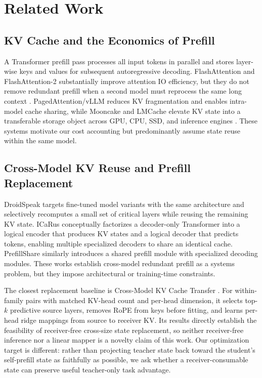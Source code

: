 \documentclass[10pt]{article}
\begin{document}
\section{Related Work}
\subsection{KV Cache and the Economics of Prefill}
A Transformer prefill pass processes all input tokens in parallel and stores layer-wise keys and
values for subsequent autoregressive decoding. FlashAttention and FlashAttention-2 substantially
improve attention IO efficiency, but they do not remove redundant prefill when a second model must
reprocess the same long context \cite{dao2022flashattention,dao2024flashattention2}.
PagedAttention/vLLM reduces KV fragmentation and enables intra-model cache sharing, while Mooncake
and LMCache elevate KV state into a transferable storage object across GPU, CPU, SSD, and
inference engines \cite{kwon2023vllm,qin2025mooncake,cheng2025lmcache}. These systems motivate our
cost accounting but predominantly assume state reuse within the same model.

\subsection{Cross-Model KV Reuse and Prefill Replacement}
DroidSpeak targets fine-tuned model variants with the same architecture and selectively recomputes
a small set of critical layers while reusing the remaining KV state. ICaRus conceptually
factorizes a decoder-only Transformer into a logical encoder that produces KV states and a logical
decoder that predicts tokens, enabling multiple specialized decoders to share an identical cache.
PrefillShare similarly introduces a shared prefill module with specialized decoding modules. These
works establish cross-model redundant prefill as a systems problem, but they impose architectural
or training-time constraints.

The closest replacement baseline is Cross-Model KV Cache Transfer \cite{heo2026crossmodel}. For
within-family pairs with matched KV-head count and per-head dimension, it selects top-$k$
predictive source layers, removes RoPE from keys before fitting, and learns per-head ridge mappings
from source to receiver KV. Its results directly establish the feasibility of receiver-free
cross-size state replacement, so neither receiver-free inference nor a linear mapper is a novelty
claim of this work. Our optimization target is different: rather than projecting teacher state
back toward the student's self-prefill state as faithfully as possible, we ask whether a
receiver-consumable state can preserve useful teacher-only task advantage.
\end{document}
